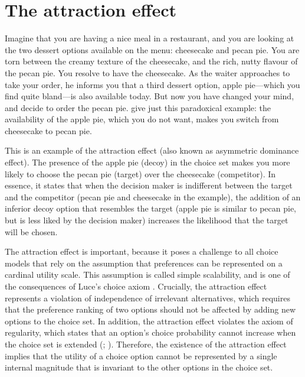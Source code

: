 \documentclass[12pt, a4paper]{article}
\begin{document}

\newpage


\section*{The attraction effect}


Imagine that you are having a nice meal in a restaurant, and you are looking at the two dessert options available on the menu: cheesecake and pecan pie. You are torn between the creamy texture of the cheesecake, and the rich, nutty flavour of the pecan pie. You resolve to have the cheesecake. As the waiter approaches to take your order, he informs you that a third dessert option, apple pie---which you find quite bland---is also available today. But now you have changed your mind, and decide to order the pecan pie.  give just this paradoxical example: the availability of the apple pie, which you do not want, makes you switch from cheesecake to pecan pie.

This is an example of the attraction effect (also known as asymmetric dominance effect). The presence of the apple pie (decoy) in the choice set makes you more likely to choose the pecan pie (target) over the cheesecake (competitor). In essence, it states that when the decision maker is indifferent between the target and the competitor (pecan pie and cheesecake in the example), the addition of an inferior decoy option that resembles the target (apple pie is similar to pecan pie, but is less liked by the decision maker) increases the likelihood that the target will be chosen.


The attraction effect is important, because it poses a challenge to all choice models that rely on the assumption that preferences can be represented on a cardinal utility scale. This assumption is called simple scalability, and is one of the consequences of Luce's choice axiom \cite{Luce1959}. Crucially, the attraction effect represents a violation of independence of irrelevant alternatives, which requires that the preference ranking of two options should not be affected by adding new options to the choice set. In addition, the attraction effect violates the axiom of regularity, which states that an option's choice probability cannot increase when the choice set is extended (; ). Therefore, the existence of the attraction effect implies that the utility of a choice option cannot be represented by a single internal magnitude that is invariant to the other options in the choice set. 
\end{document}
